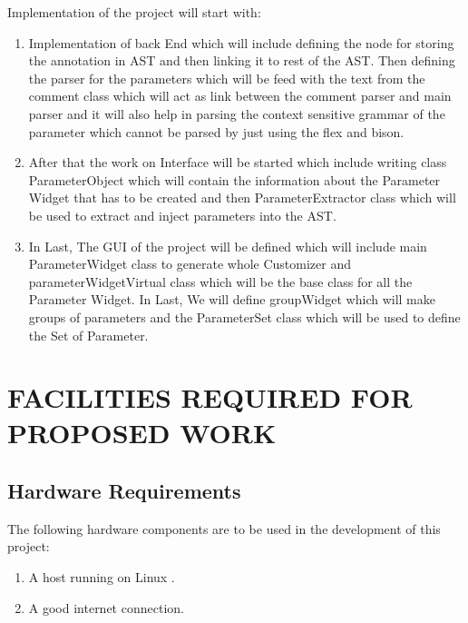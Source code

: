 \documentclass[12pt]{report}
\begin{document}
Implementation of the project will start with:
\begin{enumerate}
	\item Implementation of back End which will include defining the node for storing the annotation in AST and then linking it to rest of the AST. Then defining the parser for the parameters which will be feed with the text from the comment class which will act as link between the comment parser and main parser and it will also help in parsing the context sensitive grammar of the parameter which cannot be parsed by just using the flex and bison.
	\item After that the work on Interface will be started which include writing class ParameterObject which will contain the information about the Parameter Widget that has to be created and then ParameterExtractor class which will be used to extract and inject parameters into the AST.
	\item In Last, The GUI of the project will be defined which will include main ParameterWidget class to generate whole Customizer and parameterWidgetVirtual class which will be the base class for all the Parameter Widget. In Last, We will define groupWidget which will make groups of parameters and the ParameterSet class which will be used to define the Set of Parameter.
\end{enumerate}
 
 

\chapter{FACILITIES REQUIRED FOR PROPOSED WORK}
\section{Hardware Requirements}
The following hardware components are to be used in the development of this project:
\begin{enumerate}
	\item A host running on Linux .
	\item A good internet connection. 
\end{enumerate}
\end{document}
